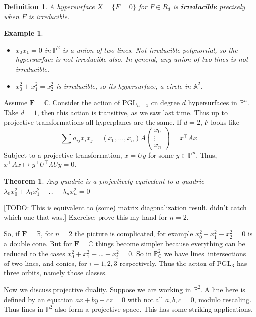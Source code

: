 \documentclass[12pt]{article}
\newcommand{\F}{\mathbf{F}}
\newcommand{\C}{\mathbb{C}}
\newcommand{\R}{\mathbb{R}}
\renewcommand{\P}{\mathbb{P}}
\newcommand{\A}{\mathbb{A}}
\newcommand{\PGL}{\mathrm{PGL}}
\newtheorem{definition}{Definition}
\newtheorem{example}[]{Example}
\newtheorem{theorem}{Theorem}
\begin{document}
    \begin{definition}
        A hypersurface $X = \{F = 0\}$ for $F \in R_d$ is \textbf{irreducible} precisely when $F$ is irreducible. 
    \end{definition}
    \begin{example}
        \begin{itemize}
            \item $x_0x_1 = 0$ in $\P^2$ is a union of two lines. Not irreducible polynomial, so the hypersurface is not irreducible also. In general, any union of two lines is not irreducible. 
            \item $x_0^2 + x_1^2 = x_2^2$ is irreducible, so its hypersurface, a circle in $\A^2$. 
        \end{itemize}
    \end{example}
    Assume $\F = \C$. Consider  the action of $\PGL_{n+1}$ on degree $d$ hypersurfaces in $\P^n$. Take $d = 1$, then this action is transitive, as we saw last time. Thus up to projective transformations all hyperplanes are the same. If $d = 2$, $F$ looks like 
    $$\sum a_{ij} x_i x_j = (x_0, \dots, x_n) A \begin{pmatrix}
        x_0 \\
        \vdots \\
        x_n
    \end{pmatrix} = x^\top A x$$
    Subject to a projective transformation, $x = Uy$ for some $y \in \P^n$. Thus, $x^\top A x \mapsto y^\top U^\top A Uy = 0$.  
    \begin{theorem}
        Any quadric is a projectively equivalent to a quadric $\lambda_0 x_0^2 + \lambda_1 x_1^2 + \dots + \lambda_n x_n^2 = 0$
    \end{theorem}
    [TODO: This is equivalent to (some) matrix diagonalization result, didn't catch which one that was.]
    Exercise: prove this my hand for $n = 2$. \par 
    So, if $\F = \R$, for $n = 2$ the picture is complicated, for example $x_0^2 - x_1^2 - x_2^2 = 0$ is a double cone. But for $\F = \C$ things become simpler because everything can be reduced to the cases $x_0^2 + x_1^2 + \dots + x_i^2 = 0$. So in $\P_\C^2$ we have lines, intersections of two lines, and conics, for $i = 1, 2, 3$ respectively. Thus the action of $\PGL_3$ has three orbits, namely those classes. \par 
    Now we discuss projective duality. Suppose we are working in $\P^2$. A line here is defined by an equation $ax + by + cz = 0$ with not all $a, b, c = 0$, modulo rescaling. Thus lines in $\P^2$ also form a projective space. This has some striking applications. \par
\end{document}
